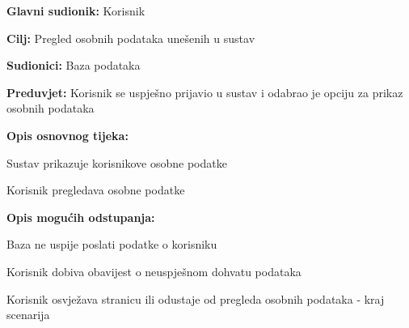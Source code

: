 					\noindent {}
					\begin{packed_item}
	
						\item \textbf{Glavni sudionik: }Korisnik
						\item  \textbf{Cilj:} Pregled osobnih podataka unešenih u sustav
						\item  \textbf{Sudionici:} Baza podataka
						\item  \textbf{Preduvjet:} Korisnik se uspješno prijavio u sustav i odabrao je opciju za prikaz osobnih podataka
						\item  \textbf{Opis osnovnog tijeka:}
						
						\item[] \begin{packed_enum}
							\item Sustav prikazuje korisnikove osobne podatke 
							\item Korisnik pregledava osobne podatke
						\end{packed_enum}
						\eject
						\item  \textbf{Opis mogućih odstupanja:}

						\item[] \begin{packed_item}
							\item[1.a] Baza ne uspije poslati podatke o korisniku
							\item[] \begin{packed_enum}
								
								\item Korisnik dobiva obavijest o neuspješnom dohvatu podataka
								\item Korisnik osvježava stranicu ili odustaje od pregleda osobnih podataka - kraj scenarija
							
							\end{packed_enum}	
						\end{packed_item}	
					\end{packed_item}


